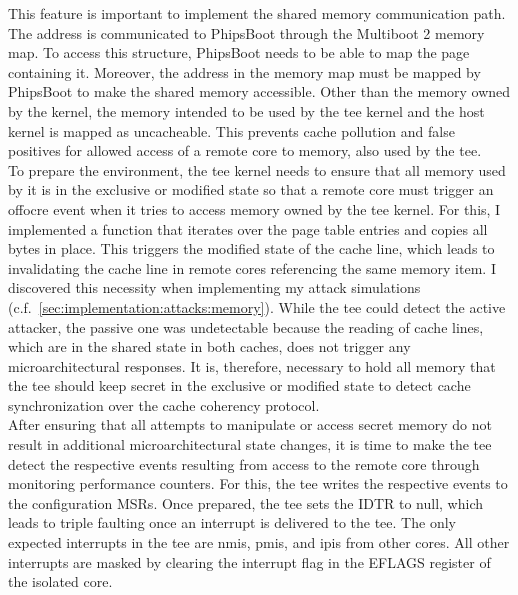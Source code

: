 This
feature is important to implement the shared memory communication path. The
address is communicated to PhipsBoot through the Multiboot 2 memory map. To
access this structure, PhipsBoot needs to be able to map the page containing it.
Moreover, the address in the memory map must be mapped by PhipsBoot to make the
shared memory accessible. Other than the memory owned by the kernel, the memory
intended to be used by the \gls{tee} kernel and the host kernel is mapped as
uncacheable. This prevents cache pollution and false positives for allowed
access of a remote core to memory, also used by the \gls{tee}.\\

To prepare the environment, the \gls{tee} kernel needs to ensure that all memory
used by it is in the exclusive or modified state so that a remote core must
trigger an offocre event
when it tries to access memory owned by the \gls{tee} kernel. For this, I
implemented a function that iterates over the page table entries and copies all
bytes in place. This triggers the modified state of the cache line, which leads
to invalidating the cache line in remote cores referencing the same memory item.
I discovered this necessity when implementing my attack simulations
(c.f.~\ref{sec:implementation:attacks:memory}). While the \gls{tee} could detect
the active attacker, the passive one was undetectable because the reading of
cache lines, which are in the shared state in both caches, does not trigger any
microarchitectural responses. It is, therefore, necessary to hold all memory
that the \gls{tee} should keep secret in the exclusive or modified state to
detect cache synchronization over the cache coherency protocol.\\

After ensuring that all attempts to manipulate or access secret memory do not
result in additional microarchitectural state changes, it is time to make the
\gls{tee} detect the respective events resulting from access to the remote core
through monitoring performance counters. For this, the \gls{tee} writes the
respective events to the configuration MSRs. Once prepared, the \gls{tee} sets
the IDTR to null, which leads to triple faulting once an interrupt is delivered
to the \gls{tee}. The only expected interrupts in the \gls{tee} are \glspl{nmi},
\glspl{pmi}, and \glspl{ipi} from other cores. All other interrupts are masked
by clearing the interrupt flag in the EFLAGS register of the isolated core. \\


